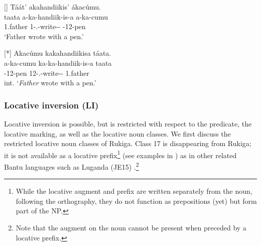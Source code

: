 \documentclass[output=paper]{langscibook}
\begin{document}
\z
\z

\ea
\label{bkm:Ref135654278}
\ea
[]{
Táát’ akahandiikis’ ákacúmu.\\
\gll
taata  a-ka-handiik-is-a  a-ka-cumu\\
1.father  1\SM{}-\F{}.\PST{}-write-\CAUS{}-\FV{}  \AUG{}-12-pen\\
\glt
‘Father wrote with a pen.’\\
}


\ex
[*]{
Akacúmu kakahandiikisa táata.\\
\gll
a-ka-cumu  ka-ka-handiik-is-a  taata\\
\AUG{}-12-pen  12\SM{}-\F{}.\PST{}-write-\CAUS{}-\FV{}  1.father\\
\glt
int. ‘\textit{Father} wrote with a pen.’\\
}


\z
\z

\subsubsection{Locative inversion (LI)}

Locative inversion is possible, but is restricted with respect to the predicate, the locative marking, as well as the locative noun classes. We first discuss the restricted locative noun classes of Rukiga. Class 17 is disappearing from Rukiga; it is not available as a locative prefix\footnote{While the locative augment and prefix are written separately from the noun, following the orthography, they do not function as prepositions (yet) but form part of the NP.} (see examples in ) as in other related Bantu languages such as Luganda (JE15) \citep{Gregoire1975}.\footnote{Note that the augment on the noun cannot be present when preceded by a locative prefix.}

\ea
\label{bkm:Ref113443792}



\z
\z
\end{document}
